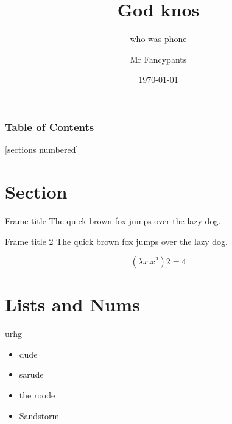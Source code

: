 \documentclass[10pt]{beamer}
\title{God knos}
\subtitle{who was phone}
\date{\today}
\author{Mr Fancypants}
\institute{NHK University of Gjallahorn}
\begin{document}
\maketitle

\begin{frame}
  \frametitle{Table of Contents}
  [sections numbered]
  \tableofcontents[hideallsubsections]
\end{frame}

\section{Section}
\begin{frame}{Frame title}
The quick brown fox jumps over the lazy dog.
\end{frame}

\begin{frame}{Frame title 2}
The quick brown fox jumps over the lazy dog.

\[
    (\lambda x.x^2) 2 = 4
\]
\end{frame}


\section{Lists and Nums}
\begin{frame}{urhg}
\begin{itemize}
\item dude
\item sarude
\item the roode
\item Sandstorm
\end{itemize}
\end{frame}

\end{document}
